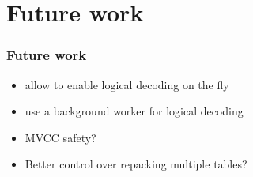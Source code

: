 \section{Future work}

\begin{frame}
  \frametitle{Future work}
  \begin{itemize}
    \item allow to enable logical decoding on the fly
    \item use a background worker for logical decoding
    \item MVCC safety?
    \item Better control over repacking multiple tables?
  \end{itemize}
\end{frame}
